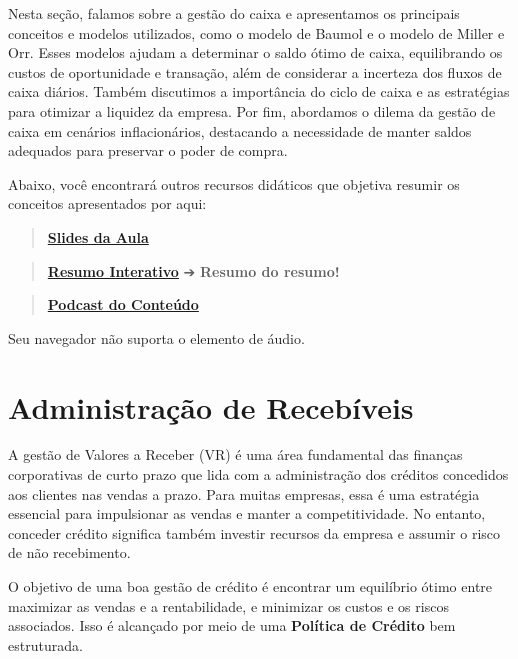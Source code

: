 \documentclass[
  a4paper,
]{book}
\begin{document}

Nesta seção, falamos sobre a gestão do caixa e apresentamos os
principais conceitos e modelos utilizados, como o modelo de Baumol e o
modelo de Miller e Orr. Esses modelos ajudam a determinar o saldo ótimo
de caixa, equilibrando os custos de oportunidade e transação, além de
considerar a incerteza dos fluxos de caixa diários. Também discutimos a
importância do ciclo de caixa e as estratégias para otimizar a liquidez
da empresa. Por fim, abordamos o dilema da gestão de caixa em cenários
inflacionários, destacando a necessidade de manter saldos adequados para
preservar o poder de compra.

Abaixo, você encontrará outros recursos didáticos que objetiva resumir
os conceitos apresentados por aqui:

\begin{quote}
\href{./resources/caixa-ppt.html}{\textbf{Slides da Aula}}
\end{quote}

\begin{quote}
\href{./resources/caixa-interativo.html}{\textbf{Resumo Interativo}} ➔
\textbf{Resumo do resumo!} 🥱
\end{quote}

\begin{quote}
\href{resources/caixa-podcast.mp3}{\textbf{Podcast do Conteúdo}}
\end{quote}

Seu navegador não suporta o elemento de áudio.


\chapter{Administração de Recebíveis}\label{sec-credito}

A gestão de Valores a Receber (VR) é uma área fundamental das finanças
corporativas de curto prazo que lida com a administração dos créditos
concedidos aos clientes nas vendas a prazo. Para muitas empresas, essa é
uma estratégia essencial para impulsionar as vendas e manter a
competitividade. No entanto, conceder crédito significa também investir
recursos da empresa e assumir o risco de não recebimento.

O objetivo de uma boa gestão de crédito é encontrar um equilíbrio ótimo
entre maximizar as vendas e a rentabilidade, e minimizar os custos e os
riscos associados. Isso é alcançado por meio de uma \textbf{Política de
Crédito} bem estruturada.
\end{document}
